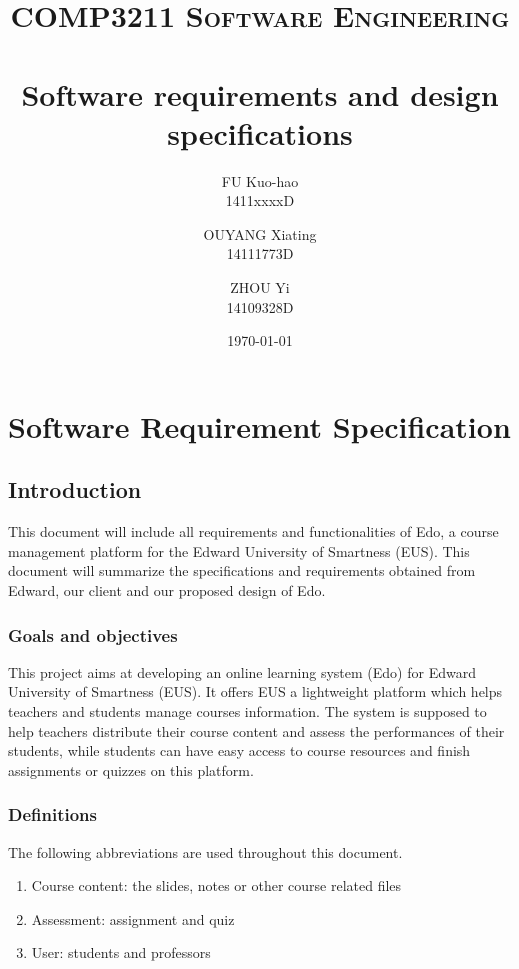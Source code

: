 \documentclass[paper=a4, fontsize=11pt]{scrartcl}
\title{
		\usefont{OT1}{bch}{b}{n}
		\normalfont \normalsize \textsc{COMP3211 Software Engineering} \\ [25pt]
		\horrule{0.5pt} \\[0.4cm]
		\huge Software requirements and design specifications
		\horrule{2pt} \\[0.5cm]
}
\author{
		\normalfont 								
        FU Kuo-hao \\
        1411xxxxD
        \and
        OUYANG Xiating \\
        14111773D
        \and
        ZHOU Yi \\
        14109328D
}
\date{\today}
\numberwithin{equation}{section}		%
\numberwithin{figure}{section}			%
\numberwithin{table}{section}				%
\begin{document}
\begin{titlepage}
\maketitle

\end{titlepage}

\begin{titlepage}
\tableofcontents
\end{titlepage}


\section{Software Requirement Specification}

\subsection{Introduction}
This document will include all requirements and functionalities of Edo, a course management platform for the Edward University of Smartness (EUS). This document will summarize the specifications and requirements obtained from Edward, our client and our proposed design of Edo.

\subsubsection{Goals and objectives}
This project aims at developing an online learning system (Edo) for Edward University of Smartness (EUS). It offers EUS a lightweight platform which helps teachers and students manage courses information. The system is supposed to help teachers distribute their course content and assess the performances of their students, while students can have easy access to course resources and finish assignments or quizzes on this platform.

\subsubsection{Definitions}
The following abbreviations are used throughout this document.
\begin{enumerate}
	\item Course content: the slides, notes or other course related files
	\item Assessment: assignment and quiz
	\item User: students and professors
\end{enumerate}
\end{document}
